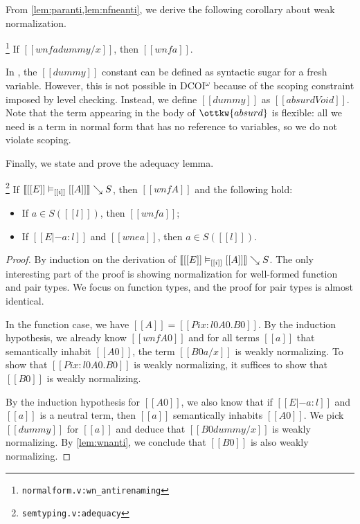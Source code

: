 \documentclass[acmsmall, screen=true, nonacm=true,
  review=\ifpublic false\else true\fi,
  anonymous=\ifanonymous true\else false\fi
]{acmart}
\makeatletter
\DeclarePairedDelimiter{\bracks}{\llbracket}{\rrbracket}
\newcommand{\name}{\texorpdfstring{DCOI$^{\omega}$\@\xspace}{DCOI-omega}}
\newcommand{\suppl}[3]{{\scriptsize\texttt{#2:#3}}}
\newcommand{\interp}[4]{\bracks{#1 \vDash_{#2} #3} \searrow #4}
\newcommand{\member}[3]{#1 \in #3(#2)}
\newlength{\punctwidth}
\newcommand{\stack}[1]{%
  \settowidth{\punctwidth}{#1}%
  \hspace*{-\the\punctwidth}%
}
\makeatother
\begin{document}
From \cref{lem:paranti,lem:nfneanti}, we derive the
following corollary about weak normalization.

\begin{lemma}
  \stack{.~}\footnote{\suppl{theories}{normalform.v}{wn\_antirenaming}}
  \label{lem:wnanti}
  If $[[wnf a {dummy / x}]]$, then $[[wnf a]]$.
\end{lemma}

In \citet{geuvers:cc-sn}, the $[[dummy]]$ constant can be defined as
syntactic sugar for a fresh variable. However, this is not possible in \name
because of the scoping constraint imposed by level checking. Instead, we define
$[[dummy]]$ as $[[absurd Void]]$. Note that the term appearing in the body of $\ottkw{absurd}$
is flexible: all we need is a term in normal form
that has no reference to variables, so we do not violate scoping.

Finally, we state and prove the adequacy lemma.

\begin{lemma}[Adequacy]
  \stack{.~}\footnote{\suppl{theories}{semtyping.v}{adequacy}}
  \label{lem:adequacy}
  If $\interp{[[E]]}{[[i]]}{[[A]]}{S}$, then $[[wnf A]]$ and the following hold:
  \begin{itemize}
  \item If $\member{a}{[[l]]}{S}$, then $[[wnf a]]$;
  \item If $[[E |- a : l]]$ and $[[wne a]]$, then $\member{a}{[[l]]}{S}$.
  \end{itemize}
\end{lemma}

\begin{proof}
  By induction on the derivation of
  $\interp{[[E]]}{[[i]]}{[[A]]}{S}$.
  The only interesting part of the proof is showing normalization for
  well-formed function and pair
  types. We focus on function types, and the proof for pair types is
  almost identical.

  In the function case, we have $[[A]] = [[Pi x : l0 A0 . B0]]$. By
  the induction hypothesis, we already know $[[wnf A0]]$ and for all
  terms $[[a]]$ that semantically inhabit $[[A0]]$, the term $[[B0 {a
    / x}]]$ is weakly normalizing. To show that $[[Pi x : l0 A0. B0]]$
  is weakly normalizing, it suffices to show that $[[B0]]$ is weakly
  normalizing.

  By the induction hypothesis for $[[A0]]$, we also know that
  if $[[E |- a : l]]$ and $[[a]]$ is a neutral term, then $[[a]]$
  semantically inhabits $[[A0]]$. We pick $[[dummy]]$
  for $[[a]]$ and deduce that $[[B0 {dummy / x}]]$ is weakly
  normalizing. By \cref{lem:wnanti}, we conclude that $[[B0]]$ is
  also weakly normalizing.
\end{proof}
\end{document}
